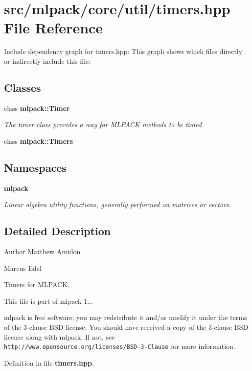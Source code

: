 \section{src/mlpack/core/util/timers.hpp File Reference}
\label{timers_8hpp}
Include dependency graph for timers.\-hpp\-:
This graph shows which files directly or indirectly include this file\-:
\subsection*{Classes}
\begin{DoxyCompactItemize}
\item 
class {\bf mlpack\-::\-Timer}
\begin{DoxyCompactList}\small\item\em The timer class provides a way for M\-L\-P\-A\-C\-K methods to be timed. \end{DoxyCompactList}\item 
class {\bf mlpack\-::\-Timers}
\end{DoxyCompactItemize}
\subsection*{Namespaces}
\begin{DoxyCompactItemize}
\item 
{\bf mlpack}
\begin{DoxyCompactList}\small\item\em Linear algebra utility functions, generally performed on matrices or vectors. \end{DoxyCompactList}\end{DoxyCompactItemize}


\subsection{Detailed Description}
\begin{DoxyAuthor}{Author}
Matthew Amidon 

Marcus Edel
\end{DoxyAuthor}
Timers for M\-L\-P\-A\-C\-K.

This file is part of mlpack 1...

mlpack is free software; you may redstribute it and/or modify it under the terms of the 3-\/clause B\-S\-D license. You should have received a copy of the 3-\/clause B\-S\-D license along with mlpack. If not, see {\tt http\-://www.\-opensource.\-org/licenses/\-B\-S\-D-\/3-\/\-Clause} for more information. 

Definition in file {\bf timers.\-hpp}.

